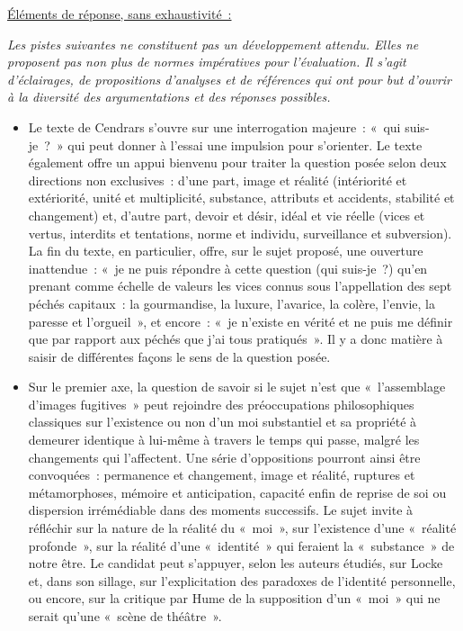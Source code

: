 {\underline{Éléments de réponse, sans exhaustivité~:}

\textit{Les pistes suivantes ne constituent pas un développement attendu. Elles ne proposent pas
non plus de normes impératives pour l'évaluation. Il s'agit d'éclairages, de propositions
d'analyses et de références qui ont pour but d'ouvrir à la diversité des argumentations et des
réponses possibles.}

\begin{itemize}
\item Le texte de Cendrars s'ouvre sur une interrogation majeure~: «~qui suis-je~?~» qui peut
donner à l'essai une impulsion pour s'orienter. Le texte également offre un appui
bienvenu pour traiter la question posée selon deux directions non exclusives~: d'une
part, image et réalité (intériorité et extériorité, unité et multiplicité, substance, attributs
et accidents, stabilité et changement) et, d'autre part, devoir et désir, idéal et vie réelle
(vices et vertus, interdits et tentations, norme et individu, surveillance et subversion).
La fin du texte, en particulier, offre, sur le sujet proposé, une ouverture inattendue~: «~je
ne puis répondre à cette question (qui suis-je~?) qu'en prenant comme échelle de
valeurs les vices connus sous l'appellation des sept péchés capitaux~: la gourmandise,
la luxure, l'avarice, la colère, l'envie, la paresse et l'orgueil~», et encore~: «~je n'existe
en vérité et ne puis me définir que par rapport aux péchés que j'ai tous pratiqués~». Il
y a donc matière à saisir de différentes façons le sens de la question posée.
\item Sur le premier axe, la question de savoir si le sujet n'est que «~l'assemblage d'images
fugitives~» peut rejoindre des préoccupations philosophiques classiques sur l'existence
ou non d'un moi substantiel et sa propriété à demeurer identique à lui-même à travers
le temps qui passe, malgré les changements qui l'affectent. Une série d'oppositions
pourront ainsi être convoquées~: permanence et changement, image et réalité, ruptures
et métamorphoses, mémoire et anticipation, capacité enfin de reprise de soi ou
dispersion irrémédiable dans des moments successifs. Le sujet invite à réfléchir sur la
nature de la réalité du «~moi~», sur l'existence d'une «~réalité profonde~», sur la réalité
d'une «~identité~» qui feraient la «~substance~» de notre être. Le candidat peut
s'appuyer, selon les auteurs étudiés, sur Locke et, dans son sillage, sur l'explicitation
des paradoxes de l'identité personnelle, ou encore, sur la critique par Hume de la
supposition d'un «~moi~» qui ne serait qu'une «~scène de théâtre~».

\end{itemize}}
